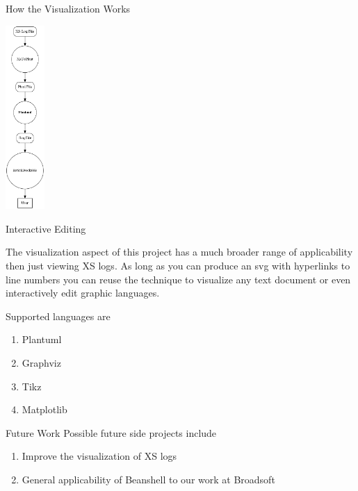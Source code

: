 \documentclass{beamer}
\begin{document}
\begin{frame}[fragile]{How the Visualization Works}
\begin{center}
\includegraphics[height=7cm]{dattflow.png}
\end{center}
\end{frame}

\begin{frame}{Interactive Editing}

The visualization aspect of this project has a much broader range of applicability then just viewing XS logs. As long as you can produce an
svg with hyperlinks to line numbers you can reuse the technique to visualize any
text document or even interactively edit graphic languages.

Supported languages are

\begin{enumerate}
\item Plantuml\cite{Plantuml}
\item Graphviz\cite{Graphviz}
\item Tikz\cite{Tikz} 
\item Matplotlib\cite{Matplotlib}
\end{enumerate}

\end{frame}



\begin{frame}{Future Work}
Possible future side projects include
\begin{enumerate}
\item Improve the visualization of XS logs
\item General applicability of Beanshell to our work at Broadsoft
\end{enumerate}
\end{frame}
\end{document}
